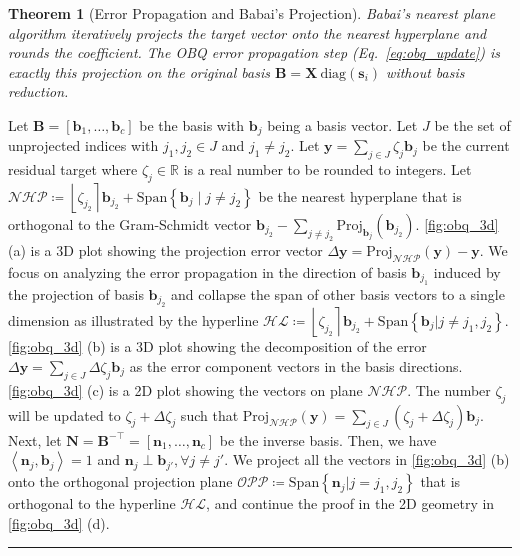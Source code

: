 \documentclass{article} %
\newcommand{\BlackBox}{\rule{1.5ex}{1.5ex}}  %
\renewenvironment{proof}{\par\noindent{\bf Proof\ }}{\hfill\BlackBox\par}
\newenvironment{proof}{\par\noindent{\bf Proof\ }}{\hfill\BlackBox\par}
\newtheorem{theorem}{Theorem}
\begin{document}
\begin{theorem}[Error Propagation and Babai's Projection]
\label{thm:obq_babai}
Babai's nearest plane algorithm iteratively projects the target vector onto the nearest hyperplane and rounds the coefficient.
The OBQ error propagation step (Eq.~\ref{eq:obq_update}) is exactly this projection on the original basis $\bm{B} = \bm{X} \mathrm{\ diag} \left( \bm{s}_{i} \right)$ without basis reduction.
\end{theorem}
\begin{proof}
Let $\bm{B} = \left[ \bm{b}_{1}, \dots, \bm{b}_{c} \right]$ be the basis with $\bm{b}_{j}$ being a basis vector.
Let $J$ be the set of unprojected indices with ${j}_{1}, {j}_{2} \in J$ and ${j}_{1} \ne {j}_{2}$.
Let $\bm{y} = \sum_{j \in J} \zeta_{j} \bm{b}_{j}$ be the current residual target where $\zeta_{j} \in \mathbb{R}$ is a real number to be rounded to integers.
Let $\mathcal{NHP} \coloneq \left\lfloor {\zeta}_{{j}_{2}} \right\rceil \bm{b}_{{j}_{2}} + \mathrm{Span} \left\{ \bm{b}_{j} \; | \; {j} \ne {j}_{2} \right\}$ be the nearest hyperplane that is orthogonal to the Gram-Schmidt vector $\bm{b}_{{j}_{2}} - \sum_{{j} \ne {j}_{2}} \mathrm{Proj}_{\bm{b}_{j}} \left( \bm{b}_{{j}_{2}} \right)$.
\cref{fig:obq_3d} (a) is a 3D plot showing the projection error vector $\Delta \bm{y} = \mathrm{Proj}_{\mathcal{NHP}} \left( \bm{y} \right) - \bm{y}$.
We focus on analyzing the error propagation in the direction of basis $\bm{b}_{{j}_{1}}$ induced by the projection of basis $\bm{b}_{{j}_{2}}$ and collapse the span of other basis vectors to a single dimension as illustrated by the hyperline $\mathcal{HL} \coloneq \left\lfloor {\zeta}_{{j}_{2}} \right\rceil \bm{b}_{{j}_{2}} + \mathrm{Span} \left\{ \bm{b}_{j} | {j} \ne {j}_{1}, {j}_{2} \right\}$.
\cref{fig:obq_3d} (b) is a 3D plot showing the decomposition of the error $\Delta \bm{y} = \sum_{j \in J} \Delta {\zeta}_{j} \bm{b}_{j}$ as the error component vectors in the basis directions.
\cref{fig:obq_3d} (c) is a 2D plot showing the vectors on plane $\mathcal{NHP}$.
The number ${\zeta}_{j}$ will be updated to ${\zeta}_{j} + \Delta {\zeta}_{j}$ such that $\mathrm{Proj}_{\mathcal{NHP}} \left( \bm{y} \right) = \sum_{j \in J} \left( \zeta_{j} + \Delta {\zeta}_{j} \right) \bm{b}_{j}$.
Next, let $\bm{N} = \bm{B}^{-\top} = \left[ \bm{n}_{1}, \dots, \bm{n}_{c} \right]$ be the inverse basis. Then, we have $\left< \bm{n}_{j} , \bm{b}_{j} \right> = 1$ and $\bm{n}_{j} \perp \bm{b}_{j'}, \forall j \ne j'$.
We project all the vectors in \cref{fig:obq_3d} (b) onto the orthogonal projection plane $\mathcal{OPP} \coloneq \mathrm{Span} \left\{ \bm{n}_{j} | j = {j}_{1}, {j}_{2} \right\}$ that is orthogonal to the hyperline $\mathcal{HL}$, and continue the proof in the 2D geometry in \cref{fig:obq_3d} (d).

\end{proof}
\end{document}
